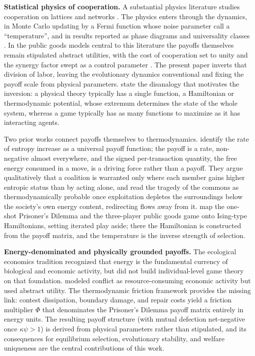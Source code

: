 \documentclass[11pt]{article}
\theoremstyle{plain}
\theoremstyle{definition}
\theoremstyle{remark}
\begin{document}
\textbf{Statistical physics of cooperation.} A substantial physics
literature studies cooperation on lattices and networks
\citep[§5]{SzaboFath2007, PercEtAl2013, PercEtAl2017, SantosSantosPacheco2008, JusupEtAl2022}.
The physics enters through the dynamics, in Monte Carlo updating by a
Fermi function \citep{PercEtAl2013} whose noise parameter
\citet{SzaboFath2007} call a ``temperature'', and in results reported as
phase diagrams and universality classes
\citep{SzaboFath2007, PercEtAl2017}. In the public goods models central
to this literature the payoffs themselves remain stipulated abstract
utilities, with the cost of cooperation set to unity and the synergy
factor swept as a control parameter
\citep{PercEtAl2013, PercEtAl2017, SantosSantosPacheco2008}. The present
paper inverts that division of labor, leaving the evolutionary dynamics
conventional and fixing the payoff scale from physical parameters.
\citet{SzaboFath2007} state the disanalogy that motivates the inversion:
a physical theory typically has a single function, a Hamiltonian or
thermodynamic potential, whose extremum determines the state of the
whole system, whereas a game typically has as many functions to maximize
as it has interacting agents.

Two prior works connect payoffs themselves to thermodynamics.
\citet{AnttilaAnnila2011} identify the rate of entropy increase as a
universal payoff function; the payoff is a rate, non-negative almost
everywhere, and the signed per-transaction quantity, the free energy
consumed in a move, is a driving force rather than a payoff. They argue
qualitatively that a coalition is warranted only where each member gains
higher entropic status than by acting alone, and read the tragedy of the
commons as thermodynamically probable once exploitation depletes the
surroundings below the society's own energy content, redirecting flows
away from it. \citet{AdamiHintze2018} map the one-shot Prisoner's
Dilemma and the three-player public goods game onto Ising-type
Hamiltonians, setting iterated play aside; there the Hamiltonian is
constructed from the payoff matrix, and the temperature is the inverse
strength of selection.

\textbf{Energy-denominated and physically grounded payoffs.} The
ecological economics tradition \citep{Lotka1922, GeorgescuRoegen1971}
recognized that energy is the fundamental currency of biological and
economic activity, but did not build individual-level game theory on
that foundation. \citet{Hirshleifer1991} modeled conflict as
resource-consuming economic activity but used abstract utility. The
thermodynamic friction framework \citep{TC-IV} provides the missing
link: contest dissipation, boundary damage, and repair costs yield a
friction multiplier \(\Phi\) that denominates the Prisoner's Dilemma
payoff matrix entirely in energy units. The resulting payoff structure
(with mutual defection net-negative once \(\kappa\psi > 1\)) is derived
from physical parameters rather than stipulated, and its consequences
for equilibrium selection, evolutionary stability, and welfare
uniqueness are the central contributions of this work.
\end{document}
